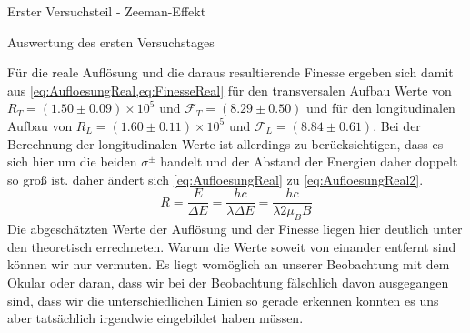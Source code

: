 \documentclass[pdftex, a4paper,11pt, twoside, ngerman]{report}
\begin{document}
\begin{chapter}{Erster Versuchsteil - Zeeman-Effekt}
\begin{section}{Auswertung des ersten Versuchstages}
\begin{subsection}
        Für die reale Auflösung und die daraus resultierende Finesse ergeben
        sich damit aus \cref{eq:AufloesungReal,eq:FinesseReal} für den
        transversalen Aufbau Werte von $R_{T}=(1.50\pm0.09) \times 10^{5}$ und
        $\mathcal{F}_{T}=(8.29\pm0.50)$ und für den longitudinalen Aufbau von
        $R_{L}=(1.60\pm 0.11) \times 10^{5}$ und
        $\mathcal{F}_{L}=(8.84\pm0.61)$. Bei der Berechnung der longitudinalen
        Werte ist allerdings zu berücksichtigen, dass es sich hier um die beiden
        $\sigma^{\pm}$ handelt und der Abstand der Energien daher doppelt so
        groß ist. daher ändert sich \cref{eq:AufloesungReal} zu
        \cref{eq:AufloesungReal2}.
        \begin{equation}
          \label{eq:AufloesungReal2}
          R=\frac{E}{\Delta E}=\frac{hc}{\lambda\Delta E} = 
          \frac{hc}{\lambda2\mu_{B}B}
        \end{equation}
        \newline
        Die abgeschätzten Werte der Auflösung und der Finesse liegen hier
        deutlich unter den theoretisch errechneten. Warum die Werte soweit von
        einander entfernt sind können wir nur vermuten. Es liegt womöglich
        an unserer Beobachtung mit dem Okular oder daran, dass wir bei der
        Beobachtung fälschlich davon ausgegangen sind, dass wir die
        unterschiedlichen Linien so gerade erkennen konnten es uns aber
        tatsächlich irgendwie eingebildet haben müssen.
        

\end{subsection}
\end{section}
\end{chapter}
\end{document}
